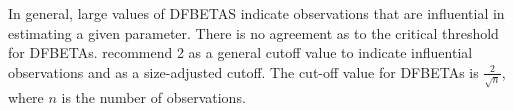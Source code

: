 \documentclass[]{report}
\begin{document}
In general, large values of DFBETAS indicate observations that are influential in estimating a given parameter. There is no agreement as to the critical threshold for DFBETAs. \citet{belsleywelsch} recommend 2 as a general cutoff value to indicate influential observations and as a size-adjusted cutoff.  The cut-off value for DFBETAs is $\frac{2}{\sqrt{n}}$, where $n$ is the number of observations. 









	
\end{document}

